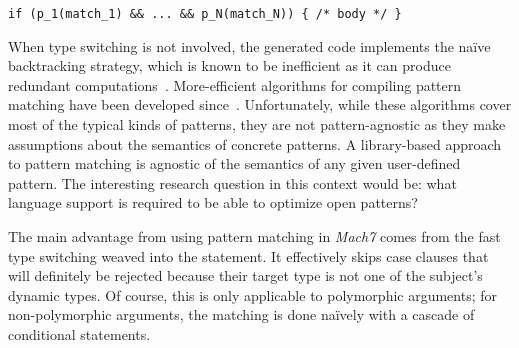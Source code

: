 \begin{lstlisting}
if (p_1(match_1) && ... && p_N(match_N)) { /* body */ }
\end{lstlisting}

\noindent
When type switching is not involved, the generated code implements the na\"ive 
backtracking strategy, which is known to be inefficient as it can produce 
redundant computations~\cite[]{Cardelli84}. More-efficient 
algorithms for compiling pattern matching have been developed 
since~\cite{Augustsson85,Maranget92,Puel93,OPM01,Maranget08}. Unfortunately, while these 
algorithms cover most of the typical kinds of patterns, they are not pattern-agnostic 
as they make assumptions about the semantics of concrete patterns. A library-based 
approach to pattern matching is agnostic of the semantics of any given 
user-defined pattern. The interesting research question in this context would 
be: what language support is required to be able to optimize open patterns? 

The main advantage from using pattern matching in \emph{Mach7} comes from the fast type 
switching weaved into the  statement. It effectively skips case 
clauses that will definitely be rejected because their target type is not one 
of the subject's dynamic types. Of course, this is only applicable to polymorphic 
arguments; for non-polymorphic arguments, the matching is done na\"ively with a
cascade of conditional statements.
